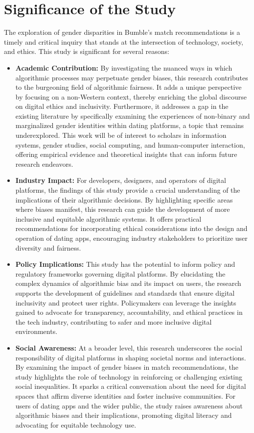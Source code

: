 \section{Significance of the Study}
The exploration of gender disparities in Bumble’s match recommendations is a timely and critical inquiry that stands at the intersection of technology, society, and ethics. This study is significant for several reasons:

\begin{itemize}
    \item \textbf{Academic Contribution:} By investigating the nuanced ways in which algorithmic processes may perpetuate gender biases, this research contributes to the burgeoning field of algorithmic fairness. It adds a unique perspective by focusing on a non-Western context, thereby enriching the global discourse on digital ethics and inclusivity. Furthermore, it addresses a gap in the existing literature by specifically examining the experiences of non-binary and marginalized gender identities within dating platforms, a topic that remains underexplored. This work will be of interest to scholars in information systems, gender studies, social computing, and human-computer interaction, offering empirical evidence and theoretical insights that can inform future research endeavors.
    \item \textbf{Industry Impact:} For developers, designers, and operators of digital platforms, the findings of this study provide a crucial understanding of the implications of their algorithmic decisions. By highlighting specific areas where biases manifest, this research can guide the development of more inclusive and equitable algorithmic systems. It offers practical recommendations for incorporating ethical considerations into the design and operation of dating apps, encouraging industry stakeholders to prioritize user diversity and fairness.
    \item \textbf{Policy Implications:} This study has the potential to inform policy and regulatory frameworks governing digital platforms. By elucidating the complex dynamics of algorithmic bias and its impact on users, the research supports the development of guidelines and standards that ensure digital inclusivity and protect user rights. Policymakers can leverage the insights gained to advocate for transparency, accountability, and ethical practices in the tech industry, contributing to safer and more inclusive digital environments.
    \item \textbf{Social Awareness:} At a broader level, this research underscores the social responsibility of digital platforms in shaping societal norms and interactions. By examining the impact of gender biases in match recommendations, the study highlights the role of technology in reinforcing or challenging existing social inequalities. It sparks a critical conversation about the need for digital spaces that affirm diverse identities and foster inclusive communities. For users of dating apps and the wider public, the study raises awareness about algorithmic biases and their implications, promoting digital literacy and advocating for equitable technology use.

\end{itemize}
